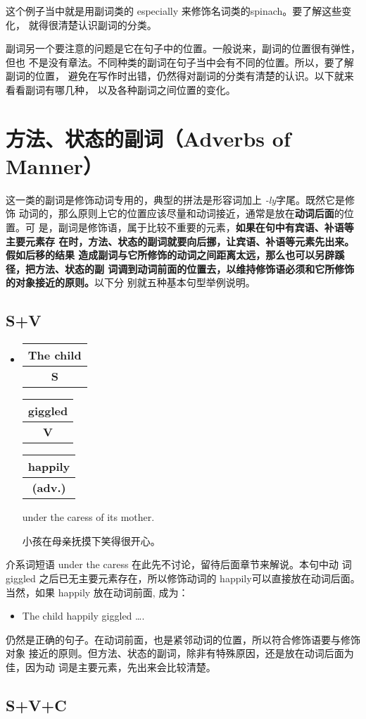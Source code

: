 \documentclass{yufa}
\makeatletter
\newcommand\unct[2]{\def\arraystretch{0.8}
  {\setlength{\tabcolsep}{0pt}
    \begin{tabular}[t]{@{}c@{}} \setlength\arrayrulewidth{0.8pt} \textbf{#1}\\\hline \textbf{\small #2} \\\end{tabular}}}
\makeatother
\begin{document}
这个例子当中就是用副词类的 especially 来修饰名词类的spinach。要了解这些变化，
就得很清楚认识副词的分类。

副词另一个要注意的问题是它在句子中的位置。一般说来，副词的位置很有弹性，但也
不是没有章法。不同种类的副词在句子当中会有不同的位置。所以，要了解副词的位置，
避免在写作时出错，仍然得对副词的分类有清楚的认识。以下就来看看副词有哪几种，
以及各种副词之间位置的变化。

\section{方法、状态的副词（Adverbs of Manner）}

这一类的副词是修饰动词专用的，典型的拼法是形容词加上 \emph{-ly}字尾。既然它是修饰
动词的，那么原则上它的位置应该尽量和动词接近，通常是放在\textbf{动词后面}的位置。可
是，副词是修饰语，属于比较不重要的元素，\textbf{如果在句中有宾语、补语等主要元素存
  在时，方法、状态的副词就要向后挪，让宾语、补语等元素先出来。假如后移的结果
  造成副词与它所修饰的动词之间距离太远，那么也可以另辟蹊径，把方法、状态的副
  词调到动词前面的位置去，以维持修饰语必须和它所修饰的对象接近的原则。}以下分
别就五种基本句型举例说明。

\subsection{S+V}

\begin{itemize}
\item  \unct{The child}{S} \unct{giggled}{V} \unct{happily}{(adv.)} under the caress of its mother.

  小孩在母亲抚摸下笑得很开心。
\end{itemize}

介系词短语 under the caress 在此先不讨论，留待后面章节来解说。本句中动
词giggled 之后已无主要元素存在，所以修饰动词的 happily可以直接放在动词后面。
当然，如果 happily 放在动词前面, 成为：
\begin{itemize}
\item  The child happily giggled \ldots.
\end{itemize}
仍然是正确的句子。在动词前面，也是紧邻动词的位置，所以符合修饰语要与修饰对象
接近的原则。但方法、状态的副词，除非有特殊原因，还是放在动词后面为佳，因为动
词是主要元素，先出来会比较清楚。

\subsection{S+V+C}
\end{document}
